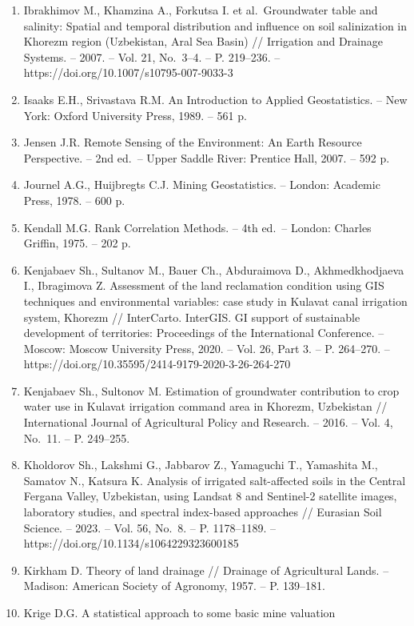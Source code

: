 \begin{enumerate}
\item
  Ibrakhimov M., Khamzina A., Forkutsa I. et al.~Groundwater table and
  salinity: Spatial and temporal distribution and influence on soil
  salinization in Khorezm region (Uzbekistan, Aral Sea Basin) //
  Irrigation and Drainage Systems. -- 2007. -- Vol. 21, No.~3--4. -- P.
  219--236. -- https://doi.org/10.1007/s10795-007-9033-3
\item
  Isaaks E.H., Srivastava R.M. An Introduction to Applied Geostatistics.
  -- New York: Oxford University Press, 1989. -- 561 p.
\item
  Jensen J.R. Remote Sensing of the Environment: An Earth Resource
  Perspective. -- 2nd ed.~-- Upper Saddle River: Prentice Hall, 2007. --
  592 p.
\item
  Journel A.G., Huijbregts C.J. Mining Geostatistics. -- London:
  Academic Press, 1978. -- 600 p.
\item
  Kendall M.G. Rank Correlation Methods. -- 4th ed.~-- London: Charles
  Griffin, 1975. -- 202 p.
\item
  Kenjabaev Sh., Sultanov M., Bauer Ch., Abduraimova D., Akhmedkhodjaeva
  I., Ibragimova Z. Assessment of the land reclamation condition using
  GIS techniques and environmental variables: case study in Kulavat
  canal irrigation system, Khorezm // InterCarto. InterGIS. GI support
  of sustainable development of territories: Proceedings of the
  International Conference. -- Moscow: Moscow University Press, 2020. --
  Vol. 26, Part 3. -- P. 264--270. --
  https://doi.org/10.35595/2414-9179-2020-3-26-264-270
\item
  Kenjabaev Sh., Sultonov M. Estimation of groundwater contribution to
  crop water use in Kulavat irrigation command area in Khorezm,
  Uzbekistan // International Journal of Agricultural Policy and
  Research. -- 2016. -- Vol. 4, No.~11. -- P. 249--255.
\item
  Kholdorov Sh., Lakshmi G., Jabbarov Z., Yamaguchi T., Yamashita M.,
  Samatov N., Katsura K. Analysis of irrigated salt-affected soils in
  the Central Fergana Valley, Uzbekistan, using Landsat 8 and Sentinel-2
  satellite images, laboratory studies, and spectral index-based
  approaches // Eurasian Soil Science. -- 2023. -- Vol. 56, No.~8. -- P.
  1178--1189. -- https://doi.org/10.1134/s1064229323600185
\item
  Kirkham D. Theory of land drainage // Drainage of Agricultural Lands.
  -- Madison: American Society of Agronomy, 1957. -- P. 139--181.
\item
  Krige D.G. A statistical approach to some basic mine valuation

\end{enumerate}
